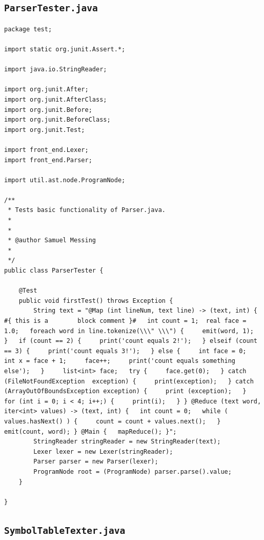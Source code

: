 \documentclass{report}
\begin{document}
\subsection{\texttt{ParserTester.java}}

\begin{verbatim}
package test;

import static org.junit.Assert.*;

import java.io.StringReader;

import org.junit.After;
import org.junit.AfterClass;
import org.junit.Before;
import org.junit.BeforeClass;
import org.junit.Test;

import front_end.Lexer;
import front_end.Parser;

import util.ast.node.ProgramNode;

/**
 * Tests basic functionality of Parser.java.
 * 
 * 
 * @author Samuel Messing
 * 
 */
public class ParserTester {

	@Test
	public void firstTest() throws Exception {
		String text = "@Map (int lineNum, text line) -> (text, int) {   #{ this is a        block comment }#   int count = 1;  real face = 1.0;   foreach word in line.tokenize(\\\" \\\") {     emit(word, 1);   }   if (count == 2) {     print('count equals 2!');   } elseif (count == 3) {     print('count equals 3!');   } else {     int face = 0;     int x = face + 1;     face++;     print('count equals something else');   }     list<int> face;   try {     face.get(0);   } catch (FileNotFoundException  exception) {     print(exception);   } catch (ArrayOutOfBoundsException exception) {     print (exception);   }   for (int i = 0; i < 4; i++;) {     print(i);   } } @Reduce (text word, iter<int> values) -> (text, int) {   int count = 0;   while ( values.hasNext() ) {     count = count + values.next();   }   emit(count, word); } @Main {   mapReduce(); }";
		StringReader stringReader = new StringReader(text);
		Lexer lexer = new Lexer(stringReader);
		Parser parser = new Parser(lexer);
		ProgramNode root = (ProgramNode) parser.parse().value;
	}

}

\end{verbatim}

\subsection{\texttt{SymbolTableTexter.java}}
\end{document}
